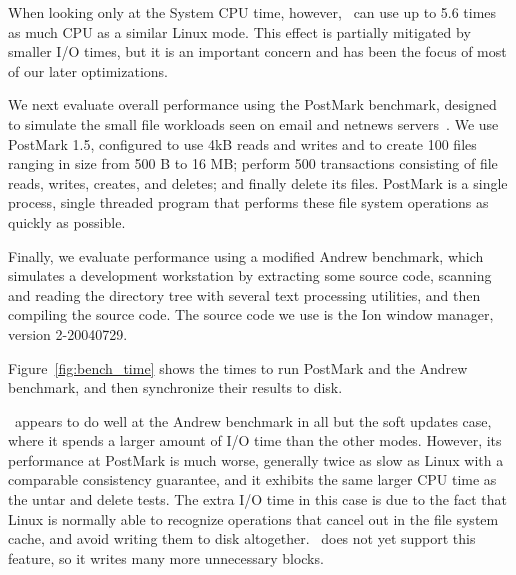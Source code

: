 When looking only at the System CPU time, however, \Kudos\ can use up to
5.6 times as much CPU as a similar Linux mode. This effect is partially
mitigated by smaller I/O times, but it is an important concern and has
been the focus of most of our later optimizations.

%
%

We next evaluate overall performance using the PostMark benchmark,
designed to simulate the small file workloads seen on email and
netnews servers~\cite{postmark}.
%
We use PostMark 1.5, configured to use 4kB reads and writes and to
create 100 files ranging in size from 500 B to 16 MB; perform 500
transactions consisting of file reads, writes, creates, and deletes;
and finally delete its files. PostMark is a single process, single
threaded program that performs these file system operations as quickly
as possible.

Finally, we evaluate performance using a modified Andrew benchmark,
which simulates a development workstation by extracting some source
code, scanning and reading the directory tree with several text
processing utilities, and then compiling the source code. The source
code we use is the Ion window manager, version 2-20040729.

Figure~\ref{fig:bench_time} shows the times to run PostMark and the Andrew
benchmark, and then synchronize their results to disk.


\Kudos\ appears to do well at the Andrew benchmark in all but the soft
updates case, where it spends a larger amount of I/O time than the other
modes. However, its performance at PostMark is much worse, generally
twice as slow as Linux with a comparable consistency guarantee, and it
exhibits the same larger CPU time as the untar and delete tests. The
extra I/O time in this case is due to the fact that Linux is normally
able to recognize operations that cancel out in the file system cache,
and avoid writing them to disk altogether. \Kudos\ does not yet support
this feature, so it writes many more unnecessary blocks.

